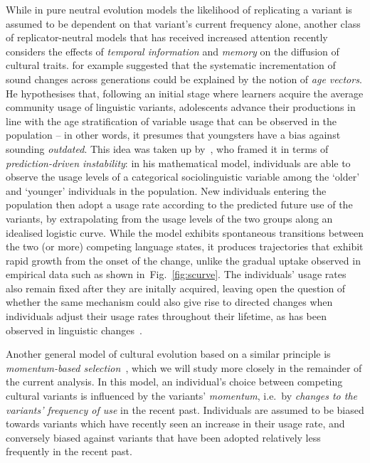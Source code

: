 While in pure neutral evolution models the likelihood of replicating a variant is assumed to be dependent on that variant's current frequency alone, another class of replicator-neutral models that has received increased attention recently considers the effects of \emph{temporal information} and \emph{memory} on the diffusion of cultural traits. %
\citet{Labov2001} for example suggested that the systematic incrementation of sound changes across generations could be explained by the notion of \emph{age vectors}.
He hypothesises that, following an initial stage where learners acquire the average community usage of linguistic variants, adolescents advance their productions in line with the age stratification of variable usage that can be observed in the population -- in other words, it presumes that youngsters have a bias against sounding \emph{outdated}. This idea was taken up by~\citet{Mitchener2011}, who framed it in terms of \emph{prediction-driven instability}: in his mathematical model, individuals are able to observe the usage levels of a categorical sociolinguistic variable among the `older' and `younger' individuals in the population. New individuals entering the population then adopt a usage rate according to the predicted future use of the variants, by extrapolating from the usage levels of the two groups along an idealised logistic curve. While the model exhibits spontaneous transitions between the two (or more) competing language states, it produces trajectories that exhibit rapid growth from the onset of the change, unlike the gradual uptake observed in empirical data such as shown in~Fig.~\ref{fig:scurve}. %
The individuals' usage rates also remain fixed after they are initally acquired, leaving open the question of whether the same mechanism could also give rise to directed changes when individuals adjust their usage rates throughout their lifetime, as has been observed in linguistic changes~\citep{Sankoff2007}.

Another general model of cultural evolution based on a similar principle is \emph{momentum-based selection}~\citep{Gureckis2009}, which we will study more closely in the remainder of the current analysis. In this model, an individual's choice between competing cultural variants is influenced by the variants' \emph{momentum}, i.e.~by \emph{changes to the variants' frequency of use} in the recent past. Individuals are assumed to be biased towards variants which have recently seen an increase in their usage rate, and conversely biased against variants that have been adopted relatively less frequently in the recent past.

